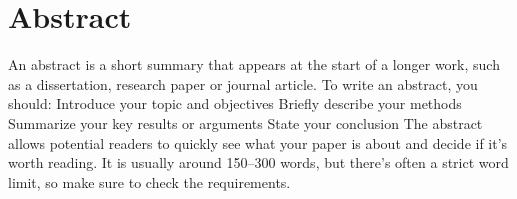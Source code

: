 \chapter*{Abstract}
\label{chap:abstract}
An abstract is a short summary that appears at the start of a longer work, such as a dissertation, research paper or journal article. To write an abstract, you should:
Introduce your topic and objectives
Briefly describe your methods
Summarize your key results or arguments
State your conclusion
The abstract allows potential readers to quickly see what your paper is about and decide if it’s worth reading. It is usually around 150–300 words, but there’s often a strict word limit, so make sure to check the requirements.